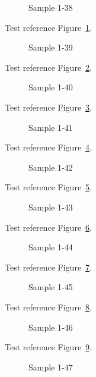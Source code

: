 \begin{figure}[tbhp]
\caption{Sample 1-38}
\label{fig:sample-1-38}
\end{figure}

Test reference Figure~\ref{fig:sample-1-38}.

\begin{figure}[tbhp]
\caption{Sample 1-39}
\label{fig:sample-1-39}
\end{figure}

Test reference Figure~\ref{fig:sample-1-39}.

\begin{figure}[tbhp]
\caption{Sample 1-40}
\label{fig:sample-1-40}
\end{figure}

Test reference Figure~\ref{fig:sample-1-40}.

\begin{figure}[tbhp]
\caption{Sample 1-41}
\label{fig:sample-1-41}
\end{figure}

Test reference Figure~\ref{fig:sample-1-41}.

\begin{figure}[tbhp]
\caption{Sample 1-42}
\label{fig:sample-1-42}
\end{figure}

Test reference Figure~\ref{fig:sample-1-42}.

\begin{figure}[tbhp]
\caption{Sample 1-43}
\label{fig:sample-1-43}
\end{figure}

Test reference Figure~\ref{fig:sample-1-43}.

\begin{figure}[tbhp]
\caption{Sample 1-44}
\label{fig:sample-1-44}
\end{figure}

Test reference Figure~\ref{fig:sample-1-44}.

\begin{figure}[tbhp]
\caption{Sample 1-45}
\label{fig:sample-1-45}
\end{figure}

Test reference Figure~\ref{fig:sample-1-45}.

\begin{figure}[tbhp]
\caption{Sample 1-46}
\label{fig:sample-1-46}
\end{figure}

Test reference Figure~\ref{fig:sample-1-46}.

\begin{figure}[tbhp]
\caption{Sample 1-47}
\label{fig:sample-1-47}
\end{figure}

